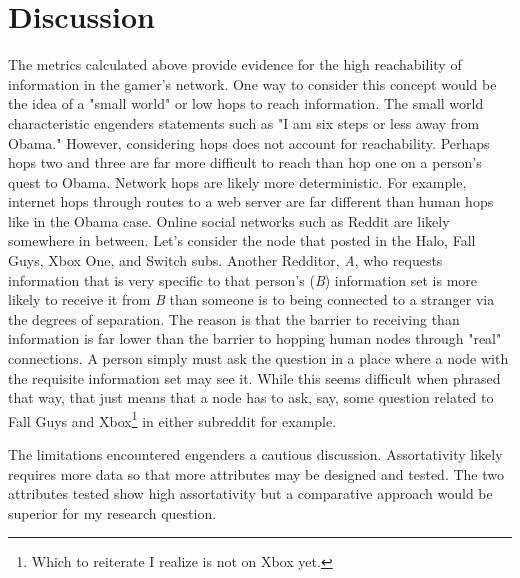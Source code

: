 \documentclass[12pt, a4paper]{article}
\begin{document}
\section{Discussion}
The metrics calculated above provide evidence for the high reachability of information in the gamer's network. One way to consider this concept would be the idea of a "small world" or low hops to reach information. The small world characteristic engenders statements such as "I am six steps or less away from Obama." However, considering hops does not account for reachability. Perhaps hops two and three are far more difficult to reach than hop one on a person's quest to Obama. Network hops are likely more deterministic. For example, internet hops through routes to a web server are far different than human hops like in the Obama case. Online social networks such as Reddit are likely somewhere in between. Let's consider the node that posted in the Halo, Fall Guys, Xbox One, and Switch subs. Another Redditor, \textit{A}, who requests information that is very specific to that person's (\textit{B}) information set is more likely to receive it from \textit{B} than someone is to being connected to a stranger via the degrees of separation. The reason is that the barrier to receiving than information is far lower than the barrier to hopping human nodes through "real" connections. A person simply must ask the question in a place where a node with the requisite information set may see it. While this seems difficult when phrased that way, that just means that a node has to ask, say, some question related to Fall Guys and Xbox\footnote{Which to reiterate I realize is not on Xbox yet.} in either subreddit for example.

The limitations encountered engenders a cautious discussion. Assortativity likely requires more data so that more attributes may be designed and tested. The two attributes tested show high assortativity but a comparative approach would be superior for my research question.
\end{document}
